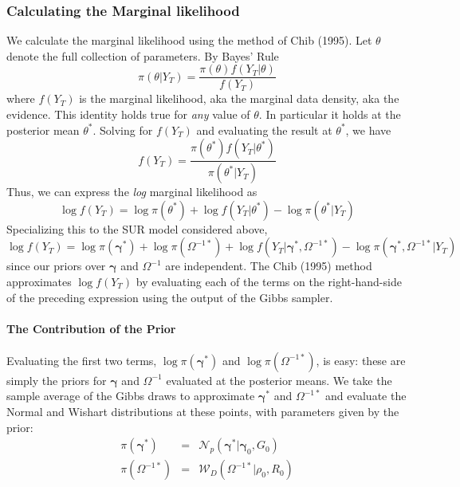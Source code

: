 \documentclass[12pt]{article}
\begin{document}
\subsubsection{Calculating the Marginal likelihood}
We calculate the marginal likelihood using the method of Chib (1995).
Let $\theta$ denote the full collection of parameters.
By Bayes' Rule
\begin{equation*}
\pi\left( \theta | Y_T \right) = \frac{\pi(\theta)f(Y_T|\theta)}{f(Y_T)}  
\end{equation*}
where $f(Y_T)$ is the marginal likelihood, aka the marginal data density, aka the evidence.
This identity holds true for \emph{any} value of $\theta$.
In particular it holds at the posterior mean $\theta^*$.
Solving for $f(Y_T)$ and evaluating the result at $\theta^*$, we have 
\begin{equation*}
f\left(Y_T \right) = \frac{\pi(\theta^*)f(Y_T|\theta^*)}{\pi(\theta^*|Y_T)}  
\end{equation*}
Thus, we can express the \emph{log} marginal likelihood as
\begin{equation*}
\log f(Y_T) = \log \pi(\theta^*) + \log f\left( Y_T|\theta^* \right) - \log \pi\left( \theta^*|Y_T \right)
\end{equation*}
Specializing this to the SUR model considered above,
\begin{equation*}
\log f(Y_T) = \log \pi(\boldsymbol{\gamma}^*) + \log \pi\left( \Omega^{-1*} \right) + \log f\left( Y_T|\boldsymbol{\gamma}^*, \Omega^{-1*} \right) - \log \pi\left( \boldsymbol{\gamma}^*, \Omega^{-1*}|Y_T \right)
\end{equation*}
since our priors over $\boldsymbol{\gamma}$ and $\Omega^{-1}$ are independent.
The Chib (1995) method approximates $\log f(Y_T)$ by evaluating each of the terms on the right-hand-side of the preceding expression using the output of the Gibbs sampler.

\paragraph{The Contribution of the Prior}
Evaluating the first two terms, $\log \pi(\boldsymbol{\gamma}^*)$ and $\log \pi\left( \Omega^{-1*} \right)$, is easy: these are simply the priors for $\boldsymbol{\gamma}$ and $\Omega^{-1}$ evaluated at the posterior means.
We take the sample average of the Gibbs draws to approximate $\boldsymbol{\gamma}^*$ and $\Omega^{-1*}$ and evaluate the Normal and Wishart distributions at these points, with parameters given by the prior:
\begin{eqnarray*}
	\pi\left( \boldsymbol{\gamma}^* \right) &=& \mathcal{N}_p\left( \boldsymbol{\gamma}^* | \boldsymbol{\gamma}_0, G_0 \right)\\
	\pi\left( \Omega^{-1*} \right) &=& \mathcal{W}_D\left( \Omega^{-1*}|\rho_0, R_0 \right)
\end{eqnarray*}
\end{document}
